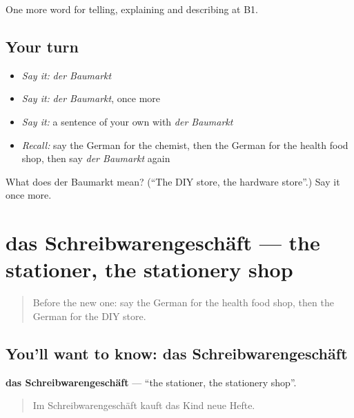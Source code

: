 \begin{grammarlens}[title={What you've built}]
One more word for telling, explaining and describing at B1.
\end{grammarlens}

\subsection*{Your turn}
\begin{itemize}
\raggedright
  \item \emph{Say it:} \emph{der Baumarkt}
  \item \emph{Say it:} \emph{der Baumarkt}, once more
  \item \emph{Say it:} a sentence of your own with \emph{der Baumarkt}
  \item \emph{Recall:} say the German for the chemist, then the German for the health food shop, then say \emph{der Baumarkt} again
\end{itemize}

\begin{tcolorbox}[breakable,colback=teal!4,colframe=teal!35!black,title={Before you move on}]
What does der Baumarkt mean? (\textquotedblleft{}The DIY store, the hardware store\textquotedblright{}.) Say it once more.
\end{tcolorbox}
\section[das Schreibwarengeschäft]{das Schreibwarengeschäft — the stationer, the stationery shop}

\label{lesson:GE-C444-schreibwarengeschaeft}



\begin{quote}
Before the new one: say the German for the health food shop, then the German for the DIY store.
\end{quote}

\subsection*{You'll want to know: das Schreibwarengeschäft}
\textbf{das Schreibwarengeschäft} — \textquotedblleft{}the stationer, the stationery shop\textquotedblright{}.

\begin{quote}
Im Schreibwarengeschäft kauft das Kind neue Hefte.
\end{quote}

